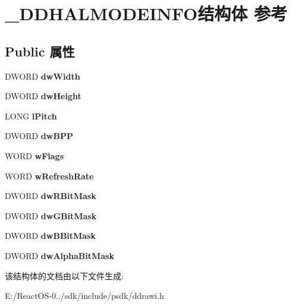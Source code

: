 \hypertarget{struct___d_d_h_a_l_m_o_d_e_i_n_f_o}{}\section{\+\_\+\+D\+D\+H\+A\+L\+M\+O\+D\+E\+I\+N\+F\+O结构体 参考}
\label{struct___d_d_h_a_l_m_o_d_e_i_n_f_o}
\subsection*{Public 属性}
\begin{DoxyCompactItemize}
\item 
\mbox{\label{struct___d_d_h_a_l_m_o_d_e_i_n_f_o_a5e01c0c670f116ac97274a528e982add}} 
D\+W\+O\+RD {\bfseries dw\+Width}
\item 
\mbox{\label{struct___d_d_h_a_l_m_o_d_e_i_n_f_o_aa8db911eced1916373ab83be1d5a84a3}} 
D\+W\+O\+RD {\bfseries dw\+Height}
\item 
\mbox{\label{struct___d_d_h_a_l_m_o_d_e_i_n_f_o_a40e8d77299e6891247888c63c154b296}} 
L\+O\+NG {\bfseries l\+Pitch}
\item 
\mbox{\label{struct___d_d_h_a_l_m_o_d_e_i_n_f_o_ad7b946df6f156404ff8db3bd7022b6ca}} 
D\+W\+O\+RD {\bfseries dw\+B\+PP}
\item 
\mbox{\label{struct___d_d_h_a_l_m_o_d_e_i_n_f_o_af4845f96bc1d734fa8811b42e3fff510}} 
W\+O\+RD {\bfseries w\+Flags}
\item 
\mbox{\label{struct___d_d_h_a_l_m_o_d_e_i_n_f_o_ae7278139e9de3a4e752e29f5d286013a}} 
W\+O\+RD {\bfseries w\+Refresh\+Rate}
\item 
\mbox{\label{struct___d_d_h_a_l_m_o_d_e_i_n_f_o_af913daac026a63ceb6a6eb183ab7f931}} 
D\+W\+O\+RD {\bfseries dw\+R\+Bit\+Mask}
\item 
\mbox{\label{struct___d_d_h_a_l_m_o_d_e_i_n_f_o_acdd37fc0111953894ee1371708ccbb06}} 
D\+W\+O\+RD {\bfseries dw\+G\+Bit\+Mask}
\item 
\mbox{\label{struct___d_d_h_a_l_m_o_d_e_i_n_f_o_a4ccc67a07df5e71e51acb3765ce9b689}} 
D\+W\+O\+RD {\bfseries dw\+B\+Bit\+Mask}
\item 
\mbox{\label{struct___d_d_h_a_l_m_o_d_e_i_n_f_o_ad7fb180c1f7de0c0cdbff602fb2bdfcf}} 
D\+W\+O\+RD {\bfseries dw\+Alpha\+Bit\+Mask}
\end{DoxyCompactItemize}


该结构体的文档由以下文件生成\+:\begin{DoxyCompactItemize}
\item 
E\+:/\+React\+O\+S-\/0../sdk/include/psdk/ddrawi.\+h\end{DoxyCompactItemize}
